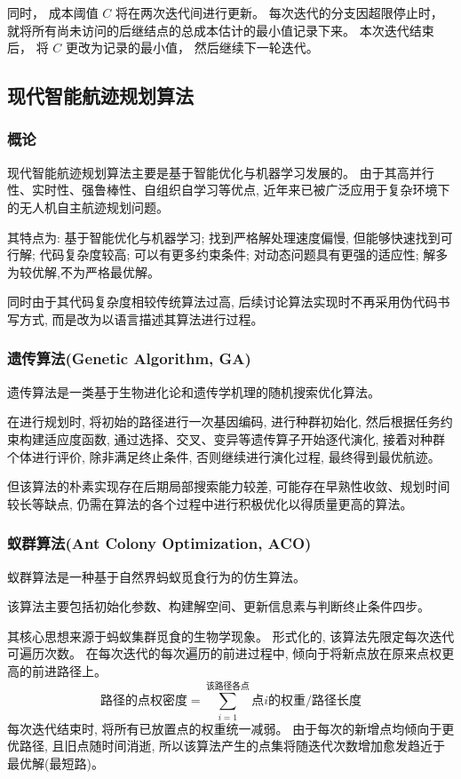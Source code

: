\documentclass[oneside,UTF8]{ctexart}
\numberwithin{figure}{section} %
\begin{document}
同时，
成本阈值 $C$ 将在两次迭代间进行更新。
每次迭代的分支因超限停止时，
就将所有尚未访问的后继结点的总成本估计的最小值记录下来。
本次迭代结束后，
将 $C$ 更改为记录的最小值，
然后继续下一轮迭代。

\subsection{现代智能航迹规划算法}
\subsubsection{概论}
现代智能航迹规划算法主要是基于智能优化与机器学习发展的。
由于其高并行性、实时性、强鲁棒性、自组织自学习等优点,
近年来已被广泛应用于复杂环境下的无人机自主航迹规划问题\textsuperscript{\cite{ref6}\cite{ref7}}。

其特点为:
基于智能优化与机器学习;
找到严格解处理速度偏慢,
但能够快速找到可行解;
代码复杂度较高;
可以有更多约束条件;
对动态问题具有更强的适应性;
解多为较优解,不为严格最优解。

同时由于其代码复杂度相较传统算法过高,
后续讨论算法实现时不再采用伪代码书写方式,
而是改为以语言描述其算法进行过程。
\subsubsection{遗传算法(Genetic Algorithm, GA)}
遗传算法是一类基于生物进化论和遗传学机理的随机搜索优化算法。

在进行规划时,
将初始的路径进行一次基因编码,
进行种群初始化,
然后根据任务约束构建适应度函数,
通过选择、交叉、变异等遗传算子开始逐代演化,
接着对种群个体进行评价,
除非满足终止条件,
否则继续进行演化过程,
最终得到最优航迹\textsuperscript{\cite{ref8}}。

但该算法的朴素实现存在后期局部搜索能力较差,
可能存在早熟性收敛、规划时间较长等缺点,
仍需在算法的各个过程中进行积极优化以得质量更高的算法。
\subsubsection{蚁群算法(Ant Colony Optimization, ACO)}
蚁群算法是一种基于自然界蚂蚁觅食行为的仿生算法。

该算法主要包括初始化参数、构建解空间、更新信息素与判断终止条件四步。

其核心思想来源于蚂蚁集群觅食的生物学现象。
形式化的,
该算法先限定每次迭代可遍历次数。
在每次迭代的每次遍历的前进过程中,
倾向于将新点放在原来点权更高的前进路径上。
\[
\text{路径的点权密度} ={ \sum_{i=1}^{\text{该路径各点}}{\text{点}i\text{的权重}} } / \text{路径长度}
\]
每次迭代结束时,
将所有已放置点的权重统一减弱。
由于每次的新增点均倾向于更优路径,
且旧点随时间消逝,
所以该算法产生的点集将随迭代次数增加愈发趋近于最优解(最短路)。
\end{document}
